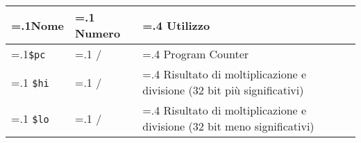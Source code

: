\documentclass[varwidth=6in]{standalone}
\providecommand\lightrule{%
	\arrayrulecolor{black!30}%
	\midrule[\lightrulewidth]%
	\arrayrulecolor{black}}
\providecommand\register[1]{%
	\texttt{#1}%
}
\begin{document}
	\begin{tabularx}{\textwidth}{ >{\hsize=.1\textwidth}X >{\hsize=.1\textwidth}X >{\hsize=.4\textwidth}X X }
		\toprule
			Nome & Numero & Utilizzo \\
		\midrule
			\register{\$pc} & / & Program Counter \\\lightrule
			\register{\$hi} & / & Risultato di moltiplicazione e divisione (\(32\) bit più significativi)\\\lightrule
			\register{\$lo} & / & Risultato di moltiplicazione e divisione (\(32\) bit meno significativi) \\
		\bottomrule
	\end{tabularx}
\end{document}

